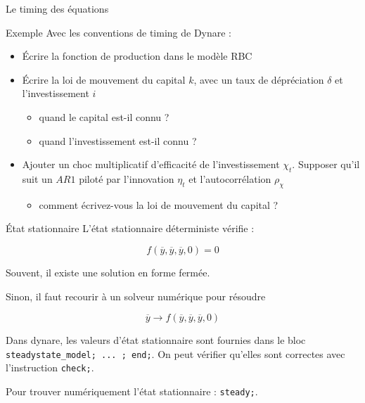 \documentclass[
  ignorenonframetext,
]{beamer}
\providecommand{\tightlist}{%
  \setlength{\itemsep}{0pt}\setlength{\parskip}{0pt}}
\begin{document}
\begin{frame}{Le timing des équations}
\label{le-timing-des-uxe9quations-1}
\begin{block}{Exemple}
\label{exemple}
Avec les conventions de timing de Dynare :

\begin{itemize}
\item
  Écrire la fonction de production dans le modèle RBC
\item
  Écrire la loi de mouvement du capital \(k\), avec un taux de
  dépréciation \(\delta\) et l'investissement \(i\)

  \begin{itemize}
  \tightlist
  \item
    quand le capital est-il connu ?
  \item
    quand l'investissement est-il connu ?
  \end{itemize}
\item
  Ajouter un choc multiplicatif d'efficacité de l'investissement
  \(\chi_t\). Supposer qu'il suit un \(AR1\) piloté par l'innovation
  \(\eta_t\) et l'autocorrélation \(\rho_{\chi}\)

  \begin{itemize}
  \tightlist
  \item
    comment écrivez-vous la loi de mouvement du capital ?
  \end{itemize}
\end{itemize}
\end{block}
\end{frame}

\begin{frame}[fragile]{État stationnaire}
\label{uxe9tat-stationnaire}
L'état stationnaire déterministe vérifie :

\[f(\overline{y},\overline{y}, \overline{y}, 0)= 0\]

Souvent, il existe une solution en forme fermée.

Sinon, il faut recourir à un solveur numérique pour résoudre

\[\overline{y}\rightarrow f(\overline{y},\overline{y}, \overline{y}, 0)\]

\begin{tcolorbox}[enhanced jigsaw, leftrule=.75mm, opacitybacktitle=0.6, rightrule=.15mm, colback=white, coltitle=black, bottomtitle=1mm, colbacktitle=quarto-callout-tip-color!10!white, title=\textcolor{quarto-callout-tip-color}{\faLightbulb}\hspace{0.5em}{Tip}, colframe=quarto-callout-tip-color-frame, arc=.35mm, left=2mm, toprule=.15mm, titlerule=0mm, breakable, toptitle=1mm, opacityback=0, bottomrule=.15mm]

Dans dynare, les valeurs d'état stationnaire sont fournies dans le bloc
\texttt{steadystate\_model;\ ...\ ;\ end;}. On peut vérifier qu'elles
sont correctes avec l'instruction \texttt{check;}.

Pour trouver numériquement l'état stationnaire : \texttt{steady;}.

\end{tcolorbox}
\end{frame}
\end{document}

